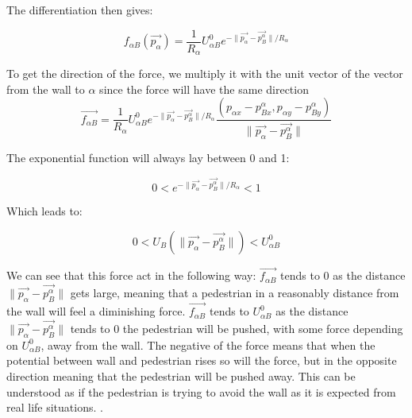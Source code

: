 The differentiation then gives: 

\begin{equation}
    f_{\alpha B} \left( \overrightarrow{p_{\alpha}} \right) 
=\frac{1}{R_{\alpha}} U^0_{\alpha B} e^{- \| \overrightarrow{p_{\alpha}} - \overrightarrow{p_{B}^{\alpha}} \| / R_{\alpha} }
\end{equation}

To get the direction of the force, we multiply it with the unit vector of the vector from the wall to $\alpha$ since the force will have the same direction 
\begin{equation}\label{eqn:wall-repulsion}
\overrightarrow{f_{\alpha B}}=\frac{1}{R_{\alpha}} U^0_{\alpha B} e^{- \| \overrightarrow{p_{\alpha}} - \overrightarrow{p_{B}^{\alpha}} \| / R_{\alpha} }\frac{\left(p_{\alpha x}-p_{Bx}^{\alpha },p_{\alpha y}-p_{By}^{\alpha }\right)}{ \| \overrightarrow{p_{\alpha}} - \overrightarrow{p_{B}^{\alpha}} \| }
\end{equation}

The exponential function will always lay between 0 and  1:

\begin{equation}
0 < e^{ -\| \overrightarrow{p_{\alpha}} - \overrightarrow{p_{B}^{\alpha}} \| /R_\alpha} < 1
\end{equation}

Which leads to:

\begin{equation}
0< U_{B} \left( \| \overrightarrow{p_{\alpha}} - \overrightarrow{p_{B}^{\alpha}} \| \right) < U^0_{\alpha B}
\end{equation}

We can see that this force act in the following way: $\overrightarrow{f_{\alpha B}}$ tends to 0 as the distance 
$\| \overrightarrow{p_{\alpha}} - \overrightarrow{p_{B}^{\alpha}} \|$ gets large, meaning that a pedestrian in a reasonably 
distance from the wall will feel a diminishing force. $\overrightarrow{f_{\alpha B}}$ tends to $U^0_{\alpha B}$ 
as the distance $ \| \overrightarrow{p_{\alpha}} - \overrightarrow{p_{B}^{\alpha}} \|$ tends to $0$ the pedestrian will be 
pushed, with some force depending on $U^0_{\alpha B}$, away from the wall. The negative of the force 
means that when the potential between wall and pedestrian rises so will the force, but in the opposite 
direction meaning that the pedestrian will be pushed away. This can be understood as if the pedestrian 
is trying to avoid the wall as it is expected from real life situations. \cite{social-force}. %

